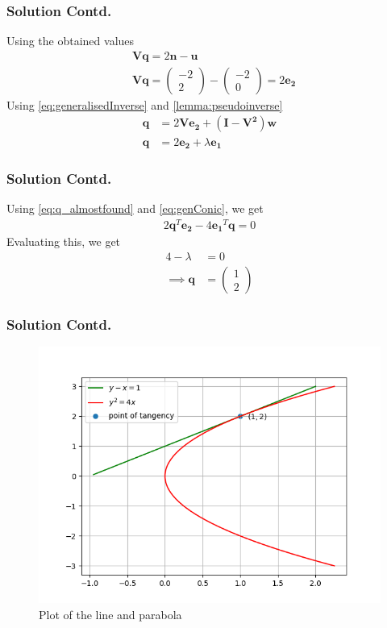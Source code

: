 \documentclass{beamer}
\newcommand{\myvec}[1]{\ensuremath{\begin{pmatrix}#1\end{pmatrix}}}
\renewcommand{\vec}[1]{\boldsymbol{#1}}
\begin{document}
\begin{frame}
    \frametitle{Solution Contd.}
    Using the obtained values
\begin{align}
    &\vec{Vq}=2\vec{n}-\vec{u}\\
    &\vec{Vq}=\myvec{-2\\2}-\myvec{-2\\0}=2\vec{e_2}
\end{align}
Using \eqref{eq:generalisedInverse} and \eqref{lemma:pseudoinverse}
\begin{align}
    \vec{q}&=2\vec{Ve_2}+(\vec{I-V^2})\vec{w}\\
    \vec{q}&=2\vec{e_2}+\lambda\vec{e_1} \label{eq:q_almostfound}
\end{align}
\end{frame}

\begin{frame}
\frametitle{Solution Contd.}
Using \eqref{eq:q_almostfound} and \eqref{eq:genConic}, we get
\begin{align}
    2\vec{q}^T\vec{e_2}-4\vec{e_1}^T\vec{q}=0
\end{align}
Evaluating this, we get
\begin{align}
    4-\lambda&=0 \\
    \implies \vec{q}&=\myvec{1\\2}
\end{align}
\end{frame}



    

\begin{frame}
\frametitle{Solution Contd.}
\begin{figure}[!h]
    \centering
    \includegraphics[width=0.8\columnwidth]{plot/figure_1}
    \caption{Plot of the line and parabola}
    \label{plot}
\end{figure}
\end{frame}
\end{document}
